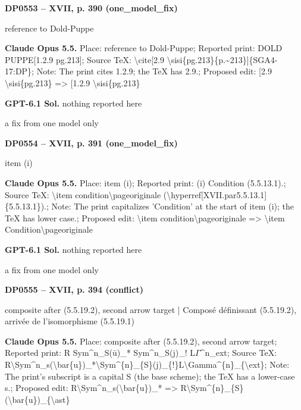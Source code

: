\par\noindent\hypertarget{DP0553}{}\textbf{DP0553 -- XVII, p. 390 (one\_model\_fix)}\par
reference to Dold-Puppe\par
\textbf{Claude Opus 5.5.} Place: reference to Dold-Puppe; Reported print: DOLD PUPPE[1.2.9 pg.213]; Source TeX: \textbackslash{}cite[2.9 \textbackslash{}sisi\{pg.213\}\{p.\textasciitilde{}213\}]\{SGA4-17:DP\}; Note: The print cites 1.2.9; the TeX has 2.9.; Proposed edit: [2.9 \textbackslash{}sisi\{pg.213\} =\allowbreak > [1.2.9 \textbackslash{}sisi\{pg.213\}\par
\textbf{GPT-6.1 Sol.} nothing reported here\par
a fix from one model only\par
\par\noindent\hypertarget{DP0554}{}\textbf{DP0554 -- XVII, p. 391 (one\_model\_fix)}\par
item (i)\par
\textbf{Claude Opus 5.5.} Place: item (i); Reported print: (i) Condition (5.5.13.1).; Source TeX: \textbackslash{}item condition\textbackslash{}pageoriginale (\textbackslash{}hyperref[XVII.par5.5.13.1]\{5.5.13.1\}).; Note: The print capitalizes 'Condition' at the start of item (i); the TeX has lower case.; Proposed edit: \textbackslash{}item condition\textbackslash{}pageoriginale =\allowbreak > \textbackslash{}item Condition\textbackslash{}pageoriginale\par
\textbf{GPT-6.1 Sol.} nothing reported here\par
a fix from one model only\par
\par\noindent\hypertarget{DP0555}{}\textbf{DP0555 -- XVII, p. 394 (conflict)}\par
composite after (5.5.19.2), second arrow target | Composé définissant (5.5.19.2), arrivée de l'isomorphisme (5.5.19.1)\par
\textbf{Claude Opus 5.5.} Place: composite after (5.5.19.2), second arrow target; Reported print: R Sym\textasciicircum{}n\_S(ū)\_* Sym\textasciicircum{}n\_S(j)\_! L\ensuremath{\Gamma}\textasciicircum{}n\_ext; Source TeX: R\textbackslash{}Sym\textasciicircum{}n\_s(\textbackslash{}bar\{u\})\_*\textbackslash{}Sym\textasciicircum{}\{n\}\_\{S\}(j)\_\{!\}L\textbackslash{}Gamma\textasciicircum{}\{n\}\_\{\textbackslash{}ext\}; Note: The print's subscript is a capital S (the base scheme); the TeX has a lower-case s.; Proposed edit: R\textbackslash{}Sym\textasciicircum{}n\_s(\textbackslash{}bar\{u\})\_* =\allowbreak > R\textbackslash{}Sym\textasciicircum{}\{n\}\_\{S\}(\textbackslash{}bar\{u\})\_\{\textbackslash{}ast\}\par
